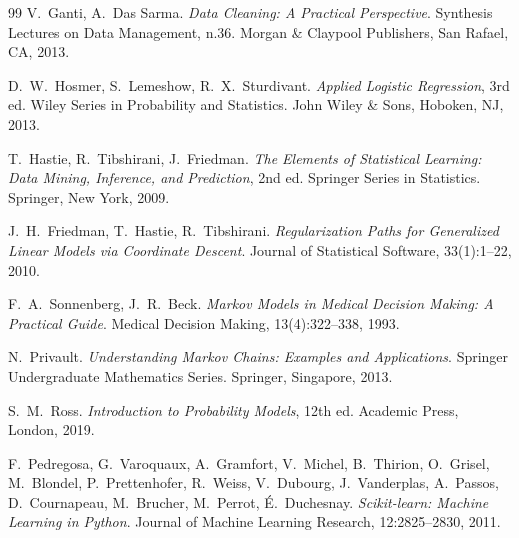 \documentclass[11pt, oneside, noexaminfo]{sapthesis}   	%
\begin{document}
\begin{thebibliography}{99}
V.~Ganti, A.~Das Sarma.
\textit{Data Cleaning: A Practical Perspective}.
Synthesis Lectures on Data Management, n.36. Morgan \& Claypool Publishers, San Rafael, CA, 2013.

D.~W.~Hosmer, S.~Lemeshow, R.~X.~Sturdivant.
\textit{Applied Logistic Regression}, 3rd ed.
Wiley Series in Probability and Statistics. John Wiley \& Sons, Hoboken, NJ, 2013.

T.~Hastie, R.~Tibshirani, J.~Friedman.
\textit{The Elements of Statistical Learning: Data Mining, Inference, and Prediction}, 2nd ed.
Springer Series in Statistics. Springer, New York, 2009.

J.~H.~Friedman, T.~Hastie, R.~Tibshirani.
\textit{Regularization Paths for Generalized Linear Models via Coordinate Descent}.
Journal of Statistical Software, 33(1):1--22, 2010.

F.~A.~Sonnenberg, J.~R.~Beck.
\textit{Markov Models in Medical Decision Making: A Practical Guide}.
Medical Decision Making, 13(4):322--338, 1993.

N.~Privault.
\textit{Understanding Markov Chains: Examples and Applications}.
Springer Undergraduate Mathematics Series. Springer, Singapore, 2013.

S.~M.~Ross.
\textit{Introduction to Probability Models}, 12th ed.
Academic Press, London, 2019.

F.~Pedregosa, G.~Varoquaux, A.~Gramfort, V.~Michel, B.~Thirion, O.~Grisel, M.~Blondel, P.~Prettenhofer, R.~Weiss, V.~Dubourg, J.~Vanderplas, A.~Passos, D.~Cournapeau, M.~Brucher, M.~Perrot, {\'E}.~Duchesnay.
\textit{Scikit-learn: Machine Learning in Python}.
Journal of Machine Learning Research, 12:2825--2830, 2011.

\end{thebibliography}
\end{document}
